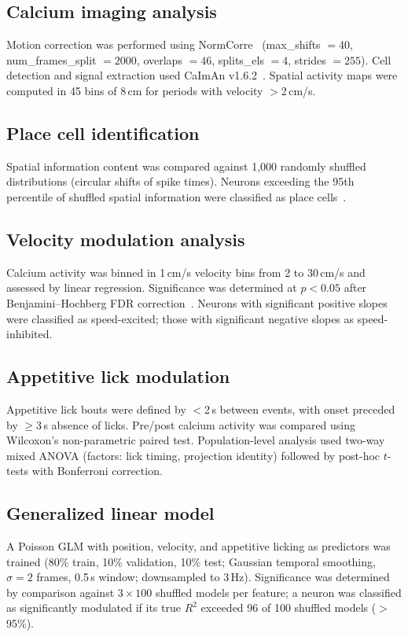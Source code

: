 \documentclass[11pt]{article}
\begin{document}
\subsection{Calcium imaging analysis}
Motion correction was performed using NormCorre~\citep{pnevmatikakis2016} (max\_shifts $= 40$, num\_frames\_split $= 2000$, overlaps $= 46$, splits\_els $= 4$, strides $= 255$). Cell detection and signal extraction used CaImAn v1.6.2~\citep{giovannucci2019}. Spatial activity maps were computed in 45 bins of 8\,cm for periods with velocity $>$2\,cm/s.

\subsection{Place cell identification}
Spatial information content was compared against 1,000 randomly shuffled distributions (circular shifts of spike times). Neurons exceeding the 95th percentile of shuffled spatial information were classified as place cells~\citep{skaggs1996}.

\subsection{Velocity modulation analysis}
Calcium activity was binned in 1\,cm/s velocity bins from 2 to 30\,cm/s and assessed by linear regression. Significance was determined at $p<0.05$ after Benjamini--Hochberg FDR correction~\citep{benjamini1995}. Neurons with significant positive slopes were classified as speed-excited; those with significant negative slopes as speed-inhibited.

\subsection{Appetitive lick modulation}
Appetitive lick bouts were defined by $<$2\,s between events, with onset preceded by $\geq$3\,s absence of licks. Pre/post calcium activity was compared using Wilcoxon's non-parametric paired test. Population-level analysis used two-way mixed ANOVA (factors: lick timing, projection identity) followed by post-hoc $t$-tests with Bonferroni correction.

\subsection{Generalized linear model}
A Poisson GLM with position, velocity, and appetitive licking as predictors was trained (80\% train, 10\% validation, 10\% test; Gaussian temporal smoothing, $\sigma = 2$ frames, 0.5\,s window; downsampled to 3\,Hz). Significance was determined by comparison against $3 \times 100$ shuffled models per feature; a neuron was classified as significantly modulated if its true $R^{2}$ exceeded 96 of 100 shuffled models ($>$95\%).
\end{document}
